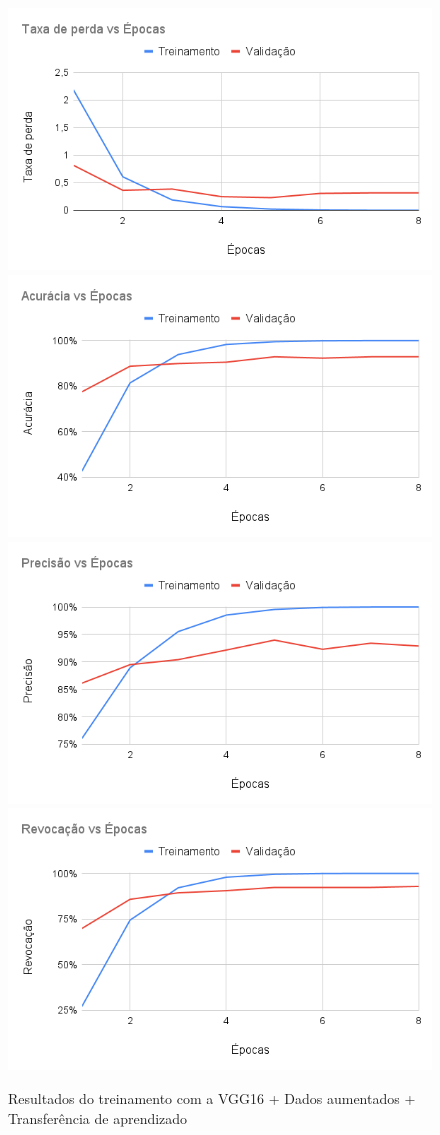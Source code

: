 \documentclass[
	12pt,				%
	oneside,			%
	a4paper,			%
	english,			%
	brazil				%
	]{abntex2ppgsi}
\begin{document}
\begin{figure}[H]
    \centering
    \caption{Resultados do treinamento com a VGG16 + Dados aumentados + Transferência de aprendizado}
    \includegraphics[width=.50\textwidth]{imagens/resultados_discussao/architecture/vgg_16/transfer_learning/augmented/perda.png}\hfill
    \includegraphics[width=.50\textwidth]{imagens/resultados_discussao/architecture/vgg_16/transfer_learning/augmented/acuracia.png}\bigbreak    \includegraphics[width=.50\textwidth]{imagens/resultados_discussao/architecture/vgg_16/transfer_learning/augmented/precisao.png}\hfill
    \includegraphics[width=.50\textwidth]{imagens/resultados_discussao/architecture/vgg_16/transfer_learning/augmented/revocacao.png}
    \label{fig:vgg_16_augmented_transfer_learning}
\end{figure}
\end{document}
